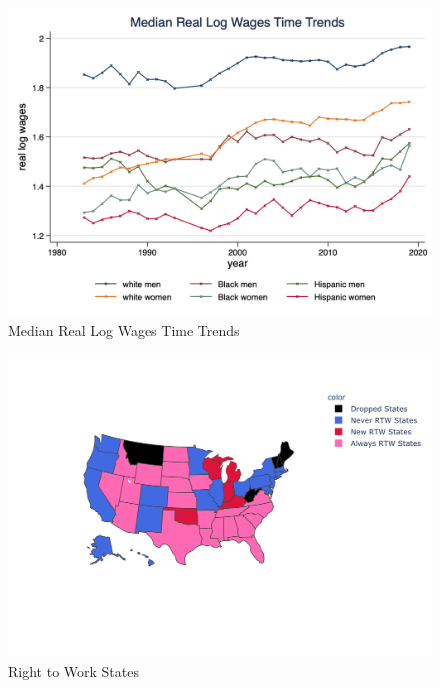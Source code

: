 \documentclass[11pt]{article}
\begin{document}
{\pagebreak
\begin{figure}[h!]
\centering
    \caption{Median Real Log Wages Time Trends}\label{fig:med_wage_time}
    \includegraphics[width=\textwidth, height = 0.8\textheight, keepaspectratio]{figures/fin_med_wage_time.png}
\end{figure}

\pagebreak
\begin{figure}[h!]
\centering
    \caption{Right to Work States}\label{fig:rtwmap}
    \includegraphics[width=\textwidth, height = 0.8\textheight, keepaspectratio]{figures/rtwmap.png}
\end{figure}

}
\end{document}
